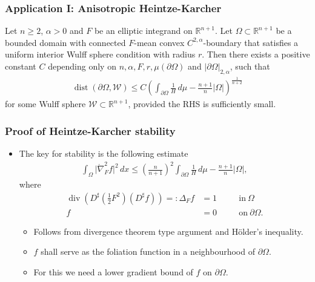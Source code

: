\documentclass{beamer}
\newcommand{\sub}{\subset}
\newcommand{\mr}{\mathring}
\newcommand{\bbR}{\mathbb{R}}
\newcommand{\8}{\infty}
\newcommand{\al}{\alpha}
\newcommand{\Om}{\Omega}
\newcommand{\De}{\Delta}
\newcommand{\cW}{\mathcal{W}}
\newcommand{\del}{\partial}
\newcommand{\n}{\nabla}
\newcommand{\fr}[2]{\frac{#1}{#2}}
\newcommand{\tfr}[2]{\tfrac{#1}{#2}}
\DeclareMathOperator{\dive}{div}
\DeclareMathOperator{\dist}{dist}
\newcommand{\eq}[1]{\begin{equation}\begin{alignedat}{2} #1 \end{alignedat}\end{equation}}
\newcommand{\br}[1]{\left(#1\right)}
\newcommand{\abs}[1]{\lvert #1\rvert}
\newcommand{\q}{\quad}
\begin{document}
\begin{frame} 
\frametitle{Application I: Anisotropic Heintze-Karcher}

\begin{theorem}
Let $n\geq 2$, $\al>0$ and $F$ be an elliptic integrand on $\mathbb{R}^{n+1}$.
Let $\Om\sub \bbR^{n+1}$ be a bounded domain with connected $F$-mean convex $C^{2,\al}$-boundary that satisfies a uniform interior Wulff sphere condition with radius $r$. 
Then there exists a positive constant $C$ depending only on $n,\al,F,r,\mu(\del\Om)$ and $\abs{\del\Om}_{2,\al}$, such that
\eq{
\dist(\del\Om,{\cW})
    \leq C
    \left(\int_{\del\Om}\frac{1}{H}\,d\mu-\frac{n+1}{n}\vert\Om\vert\right)^{\frac{1}{n+2}}
}
for some Wulff sphere ${\cW}\subset\mathbb{R}^{n+1}$, provided the RHS is sufficiently small.
\end{theorem}
\end{frame}




\begin{frame} 
\frametitle{Proof of Heintze-Karcher stability}

\begin{itemize}
\item The key for stability is the following estimate
	\eq{\int_{\Om}\abs{\mr\n^{2}_{F}f}^{2}\,dx\leq \br{\fr{n}{n+1}}^{2}\int_{\del\Om}\fr{1}{H}\,d\mu -\fr{n+1}{n}\abs{\Om},}
	where
	\eq{\dive(D^{\sharp}(\tfr 12 F^{2})(D^{\sharp}f)) =: \De_{F}f&=1\q &&\mbox{in}~\Om\\
	f&=0\q &&\mbox{on}~\del\Om.}
	\begin{itemize}
		\item Follows from divergence theorem type argument and H\"older's inequality.
		\item $f$ shall serve as the foliation function in a neighbourhood of $\del\Om$. 
		\item For this we need a lower gradient bound of $f$ on $\del\Om$.
	\end{itemize}
\end{itemize}
\end{frame}
\end{document}
